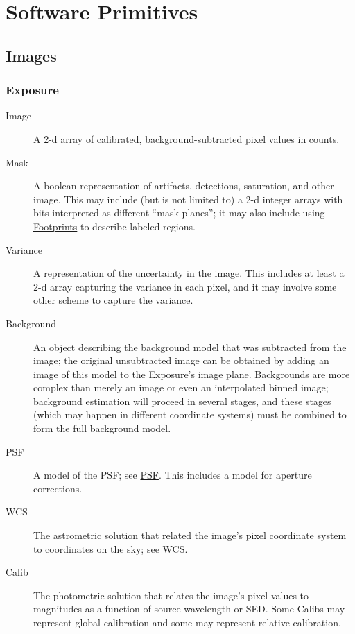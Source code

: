 \section{Software Primitives}
\label{sec:software-primitives}

\subsection{Images}
\label{sec:spImages}

\subsubsection{Exposure}
\label{sec:spImagesExposure}

\begin{description}
\item[Image] A 2-d array of calibrated, background-subtracted pixel values in counts.
\item[Mask] A boolean representation of artifacts, detections, saturation, and other image.  This may include (but is not limited to) a 2-d integer arrays with bits interpreted as different ``mask planes''; it may also include using \hyperref[sec:spFootprints]{Footprints} to describe labeled regions.
\item[Variance] A representation of the uncertainty in the image.  This includes at least a 2-d array capturing the variance in each pixel, and it may involve some other scheme to capture the variance.
\item[Background] An object describing the background model that was subtracted from the image; the original unsubtracted image can be obtained by adding an image of this model to the Exposure's image plane.  Backgrounds are more complex than merely an image or even an interpolated binned image; background estimation will proceed in several stages, and these stages (which may happen in different coordinate systems) must be combined to form the full background model.
\item[PSF] A model of the PSF; see \hyperref[sec:spPSF]{PSF}.  This includes a model for aperture corrections.
\item[WCS] The astrometric solution that related the image's pixel coordinate system to coordinates on the sky; see \hyperref[sec:spWCS]{WCS}.
\item[Calib] The photometric solution that relates the image's pixel values to magnitudes as a function of source wavelength or SED.  Some Calibs may represent global calibration and some may represent relative calibration.
\end{description}

